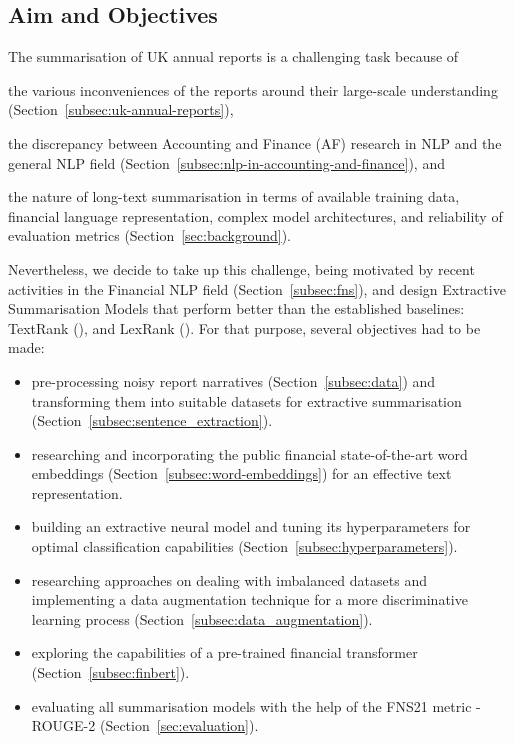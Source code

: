 \subsection{Aim and Objectives}\label{subsec:aim-and-objectives}
The summarisation of UK annual reports is a challenging task because of
 \begin{enumerate*}
     \item the various inconveniences of the reports around their large-scale understanding (Section~\ref{subsec:uk-annual-reports}),
     \item the discrepancy between Accounting and Finance (AF) research in NLP and the general NLP field (Section~\ref{subsec:nlp-in-accounting-and-finance}), and
     \item the nature of long-text summarisation in terms of available training data, financial language representation, complex model architectures, and reliability of evaluation metrics (Section~\ref{sec:background}).
 \end{enumerate*}
 Nevertheless, we decide to take up this challenge, being motivated by recent activities in the Financial NLP field (Section~\ref{subsec:fns}), and design Extractive Summarisation Models that perform better than the established baselines: TextRank (\cite{mihalcea-tarau-2004-textrank}), and LexRank (\cite{Erkan2004LexRankGC}).
 For that purpose, several objectives had to be made:
 \begin{itemize}
     \item pre-processing noisy report narratives (Section~\ref{subsec:data}) and transforming them into suitable datasets for extractive summarisation (Section~\ref{subsec:sentence_extraction}).
     \item researching and incorporating the public financial state-of-the-art word embeddings (Section~\ref{subsec:word-embeddings}) for an effective text representation.
     \item building an extractive neural model and tuning its hyperparameters for optimal classification capabilities (Section~\ref{subsec:hyperparameters}).
     \item researching approaches on dealing with imbalanced datasets and implementing a data augmentation technique for a more discriminative learning process (Section~\ref{subsec:data_augmentation}).
     \item exploring the capabilities of a pre-trained financial transformer (Section~\ref{subsec:finbert}).
     \item evaluating all summarisation models with the help of the FNS21 metric - ROUGE-2 (Section~\ref{sec:evaluation}).
 \end{itemize}